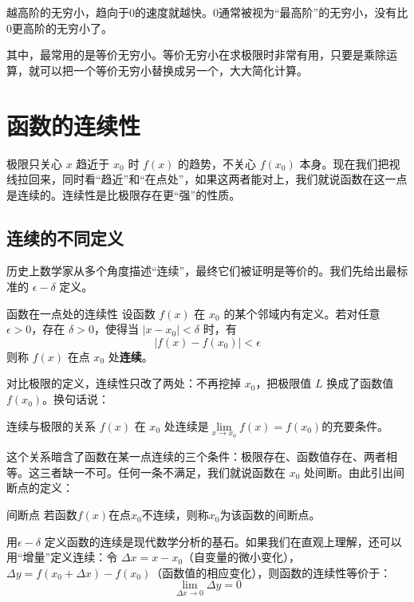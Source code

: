 越高阶的无穷小，趋向于$0 $的速度就越快。$0 $通常被视为“最高阶”的无穷小，没有比$ 0 $更高阶的无穷小了。

其中，最常用的是等价无穷小。等价无穷小在求极限时非常有用，只要是乘除运算，就可以把一个等价无穷小替换成另一个，大大简化计算。

\section{函数的连续性}

极限只关心 $x$ 趋近于 $x_0$ 时 $f(x)$ 的趋势，不关心 $f(x_0)$ 本身。现在我们把视线拉回来，同时看“趋近”和“在点处”，如果这两者能对上，我们就说函数在这一点是连续的。连续性是比极限存在更“强”的性质。

\subsection{连续的不同定义}

历史上数学家从多个角度描述“连续”，最终它们被证明是等价的。我们先给出最标准的 $\epsilon-\delta$ 定义。

\begin{definition}{函数在一点处的连续性}{}
设函数 $f(x)$ 在 $x_0$ 的某个邻域内有定义。若对任意 $\epsilon > 0$，存在 $\delta > 0$，使得当 $|x - x_0| < \delta$ 时，有
\[
|f(x) - f(x_0)| < \epsilon
\]
则称 $f(x)$ 在点 $x_0$ 处\textbf{连续}。
\end{definition}

对比极限的定义，连续性只改了两处：不再挖掉 $x_0$，把极限值 $L$ 换成了函数值 $f(x_0)$。换句话说：

\begin{theorem}{连续与极限的关系}{}
$f(x)$ 在 $x_0$ 处连续是$\lim\limits_{x \to x_0} f(x) = f(x_0)$的充要条件。

\end{theorem}

这个关系暗含了函数在某一点连续的三个条件：极限存在、函数值存在、两者相等。这三者缺一不可。任何一条不满足，我们就说函数在 $x_0$ 处间断。由此引出间断点的定义：

\begin{definition}{间断点}{}
  若函数$f(x)$在点$x_0$不连续，则称$x_0$为该函数的间断点。
\end{definition}

用$\epsilon-\delta$ 定义函数的连续是现代数学分析的基石。如果我们在直观上理解，还可以用“增量”定义连续：令 $\Delta x = x - x_0$（自变量的微小变化），$\Delta y = f(x_0 + \Delta x) - f(x_0)$（函数值的相应变化），则函数的连续性等价于：
\[
\lim_{\Delta x \to 0} \Delta y = 0
\]

